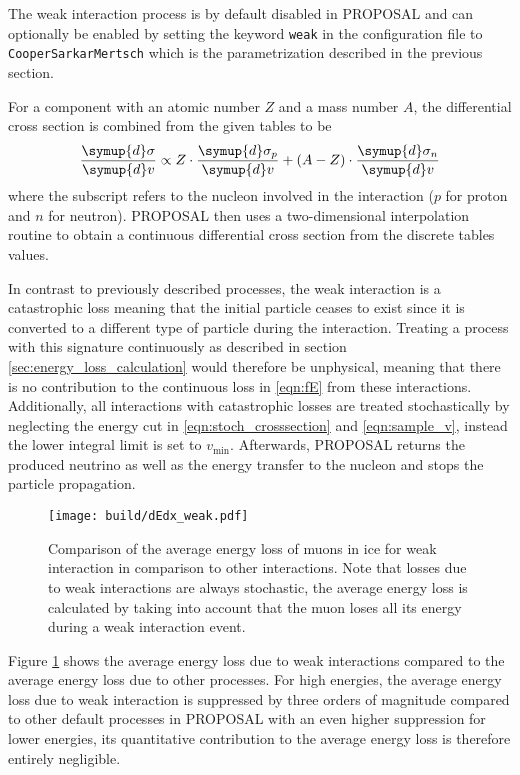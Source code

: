\begin{sloppypar}
The weak interaction process is by default disabled in PROPOSAL and can optionally be enabled by setting the keyword \texttt{weak} in the configuration file to \texttt{CooperSarkarMertsch} which is the parametrization described in the previous section.
\end{sloppypar}
For a component with an atomic number $Z$ and a mass number $A$, the differential cross section is combined from the given tables to be
%
\begin{equation}
	\frac{\symup{d}\sigma}{\symup{d}v} \propto Z \cdot \frac{\symup{d}\sigma_p}{\symup{d}v} + (A - Z) \cdot \frac{\symup{d}\sigma_n}{\symup{d}v}
\end{equation}
%
where the subscript refers to the nucleon involved in the interaction ($p$ for proton and $n$ for neutron).
PROPOSAL then uses a two-dimensional interpolation routine to obtain a continuous differential cross section from the discrete tables values.

In contrast to previously described processes, the weak interaction is a catastrophic loss meaning that the initial particle ceases to exist since it is converted to a different type of particle during the interaction.
Treating a process with this signature continuously as described in section \ref{sec:energy_loss_calculation} would therefore be unphysical, meaning that there is no contribution to the continuous loss in \eqref{eqn:fE} from these interactions.
Additionally, all interactions with catastrophic losses are treated stochastically by neglecting the energy cut in \eqref{eqn:stoch_crosssection} and \eqref{eqn:sample_v}, instead the lower integral limit is set to $v_{\text{min}}$.
Afterwards, PROPOSAL returns the produced neutrino as well as the energy transfer to the nucleon and stops the particle propagation.

\begin{figure}
    \centering
    \texttt{[image: build/dEdx\_weak.pdf]}
    \caption{Comparison of the average energy loss of muons in ice for weak interaction in comparison to other interactions. Note that losses due to weak interactions are always stochastic, the average energy loss is calculated by taking into account that the muon loses all its energy during a weak interaction event.}
    \label{fig:dEdx_weak}
\end{figure}

Figure \ref{fig:dEdx_weak} shows the average energy loss due to weak interactions compared to the average energy loss due to other processes.
For high energies, the average energy loss due to weak interaction is suppressed by three orders of magnitude compared to other default processes in PROPOSAL with an even higher suppression for lower energies, its quantitative contribution to the average energy loss is therefore entirely negligible.

